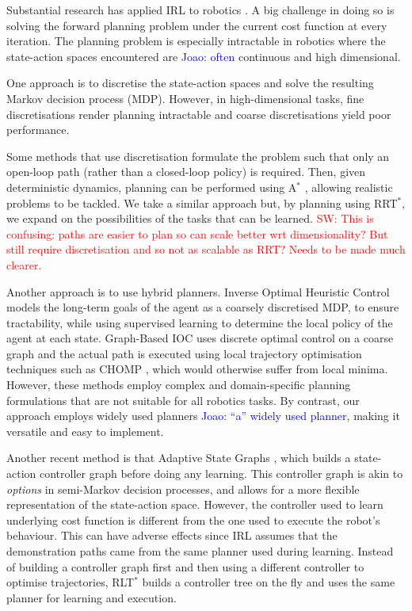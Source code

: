 \documentclass[letterpaper, 10 pt, conference]{ieeeconf}
\newcommand{\jm}[1]{\textcolor{blue}{Joao: #1}}
\newcommand{\sw}[1]{\textcolor{red}{SW: #1}}
\begin{document}
Substantial research has applied IRL to robotics \cite{henry2010learning,abbeel2008apprenticeship,vasquez2014inverse}.
A big challenge in doing so is solving the forward planning problem under the current cost function at every iteration. The planning problem is especially intractable in robotics where the state-action spaces encountered are \jm{often} continuous and high dimensional. %

One approach is to discretise the state-action spaces and solve the resulting Markov decision process (MDP). However, in high-dimensional tasks, fine discretisations render planning intractable and coarse discretisations yield poor performance.

Some methods that use discretisation formulate the problem such that only an open-loop path (rather than a closed-loop policy) is required. Then, given deterministic dynamics, planning can be performed using A$^*$ \cite{ratliff2006maximum}, allowing realistic problems to be tackled. We take a similar approach but, by planning using RRT$^*$, we expand on the possibilities of the tasks that can be learned. \sw{This is confusing: paths are easier to plan so can scale better wrt dimensionality?  But still require discretisation and so not as scalable as RRT?  Needs to be made much clearer.}

Another approach is to use hybrid planners. Inverse Optimal Heuristic Control \cite{ratliff2009inverse} models the long-term goals of the agent as a coarsely discretised MDP, to ensure tractability, while using supervised learning to determine the local policy of the agent at each state. Graph-Based IOC \cite{byravan2015graph} uses discrete optimal control on a coarse graph and the actual path is executed using local trajectory optimisation techniques such as CHOMP \cite{ratliff2009chomp}, which would otherwise suffer from local minima. However, these methods employ complex and domain-specific planning formulations that are not suitable for all robotics tasks. By contrast, our approach employs widely used planners \jm{``a'' widely used planner}, making it versatile and easy to implement. 

Another recent method is that Adaptive State Graphs \cite{okallearning}, which builds a state-action controller graph before doing any learning. This controller graph is akin to \emph{options} in semi-Markov decision processes, and allows for a more flexible representation of the state-action space. However, the controller used to learn underlying cost function is different from the one used to execute the robot's behaviour. This can have adverse effects since IRL  assumes that the demonstration paths came from the same planner used during learning.  Instead of building a controller graph first and then using a different controller to optimise trajectories, RLT$^*$ builds a controller tree on the fly and uses the same planner for learning and execution.
\end{document}

